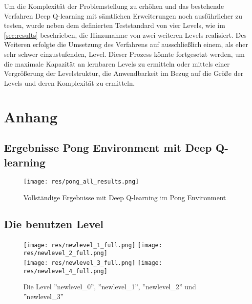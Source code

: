 \documentclass[11pt]{scrartcl}
\begin{document}
Um die Komplexität der Problemstellung zu erhöhen und das bestehende Verfahren Deep Q-learning mit
sämtlichen Erweiterungen noch ausführlicher zu testen, wurde neben dem definierten Teststandard von
vier Levels, wie im \autoref{sec:results} beschrieben, die Hinzunahme von zwei weiteren Levels
realisiert. Des Weiteren erfolgte die Umsetzung des Verfahrens auf ausschließlich einem, als eher
sehr schwer einzustufenden, Level. Dieser Prozess könnte fortgesetzt werden, um die maximale
Kapazität an lernbaren Levels zu ermitteln oder mittels einer Vergrößerung der Levelstruktur, die
Anwendbarkeit im Bezug auf die Größe der Levels und deren Komplexität zu ermitteln.


\newpage
%


\newpage
\listoffigures 
\listoftables 

\newpage
\section{Anhang}

\subsection{Ergebnisse Pong Environment mit Deep Q-learning}
\begin{figure}[htp]
\centering
\texttt{[image: res/pong\_all\_results.png]}
\caption{Vollständige Ergebnisse mit Deep Q-learning im Pong Environment}
\label{fig:pong_all_results}
\end{figure}

\subsection{Die benutzen Level}
\label{sec:levels}
\begin{figure}[htp]
\centering
\texttt{[image: res/newlevel\_1\_full.png]}
\texttt{[image: res/newlevel\_2\_full.png]}
\newline
\hspace{10pt}\\
\texttt{[image: res/newlevel\_3\_full.png]}
\texttt{[image: res/newlevel\_4\_full.png]}

\caption{
  Die Level ''newlevel\_0'', ''newlevel\_1'',
            ''newlevel\_2'' und ''newlevel\_3''
        }
\end{figure}
\end{document}
